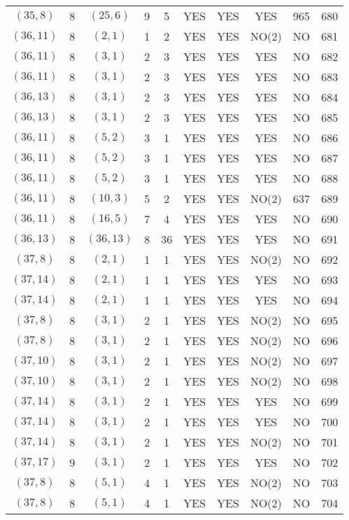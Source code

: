 \begin{longtable}{|c|c|c|c|c|c|c|c|c|c|}
$(35, 8)$ & 8 & $(25, 6)$ & 9 & 5 & YES & YES & YES & 965 & 680\\
$(36, 11)$ & 8 & $(2, 1)$ & 1 & 2 & YES & YES & NO(2) & NO & 681\\
$(36, 11)$ & 8 & $(3, 1)$ & 2 & 3 & YES & YES & YES & NO & 682\\
$(36, 11)$ & 8 & $(3, 1)$ & 2 & 3 & YES & YES & YES & NO & 683\\
$(36, 13)$ & 8 & $(3, 1)$ & 2 & 3 & YES & YES & YES & NO & 684\\
$(36, 13)$ & 8 & $(3, 1)$ & 2 & 3 & YES & YES & YES & NO & 685\\
$(36, 11)$ & 8 & $(5, 2)$ & 3 & 1 & YES & YES & YES & NO & 686\\
$(36, 11)$ & 8 & $(5, 2)$ & 3 & 1 & YES & YES & YES & NO & 687\\
$(36, 11)$ & 8 & $(5, 2)$ & 3 & 1 & YES & YES & YES & NO & 688\\
$(36, 11)$ & 8 & $(10, 3)$ & 5 & 2 & YES & YES & NO(2) & 637 & 689\\
$(36, 11)$ & 8 & $(16, 5)$ & 7 & 4 & YES & YES & YES & NO & 690\\
$(36, 13)$ & 8 & $(36, 13)$ & 8 & 36 & YES & YES & YES & NO & 691\\
$(37, 8)$ & 8 & $(2, 1)$ & 1 & 1 & YES & YES & NO(2) & NO & 692\\
$(37, 14)$ & 8 & $(2, 1)$ & 1 & 1 & YES & YES & YES & NO & 693\\
$(37, 14)$ & 8 & $(2, 1)$ & 1 & 1 & YES & YES & YES & NO & 694\\
$(37, 8)$ & 8 & $(3, 1)$ & 2 & 1 & YES & YES & NO(2) & NO & 695\\
$(37, 8)$ & 8 & $(3, 1)$ & 2 & 1 & YES & YES & NO(2) & NO & 696\\
$(37, 10)$ & 8 & $(3, 1)$ & 2 & 1 & YES & YES & NO(2) & NO & 697\\
$(37, 10)$ & 8 & $(3, 1)$ & 2 & 1 & YES & YES & NO(2) & NO & 698\\
$(37, 14)$ & 8 & $(3, 1)$ & 2 & 1 & YES & YES & YES & NO & 699\\
$(37, 14)$ & 8 & $(3, 1)$ & 2 & 1 & YES & YES & YES & NO & 700\\
$(37, 14)$ & 8 & $(3, 1)$ & 2 & 1 & YES & YES & NO(2) & NO & 701\\
$(37, 17)$ & 9 & $(3, 1)$ & 2 & 1 & YES & YES & YES & NO & 702\\
$(37, 8)$ & 8 & $(5, 1)$ & 4 & 1 & YES & YES & NO(2) & NO & 703\\
$(37, 8)$ & 8 & $(5, 1)$ & 4 & 1 & YES & YES & NO(2) & NO & 704\\

\end{longtable}
